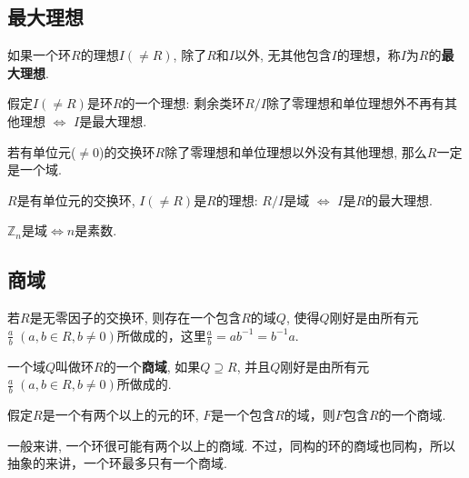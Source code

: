 \subsection{最大理想}

\begin{Definition}[最大理想]
如果一个环$R$的理想$I (\neq R)$, 除了$R$和$I$以外, 无其他包含$I$的理想，称$I$为$R$的\textbf{最大理想}.
\end{Definition}

\begin{Lemma}
假定$I (\neq R)$是环$R$的一个理想: 剩余类环$R/I$除了零理想和单位理想外不再有其他理想 $\Leftrightarrow$ $I$是最大理想.
\end{Lemma}

\begin{Lemma}
若有单位元($\neq \mathfrak{0}$)的交换环$R$除了零理想和单位理想以外没有其他理想, 那么$R$一定是一个域.
\end{Lemma}

\begin{Theorem}[!]
$R$是有单位元的交换环, $I (\neq R)$是$R$的理想: $R/I$是域 $\Leftrightarrow$
$I$是$R$的最大理想.
\end{Theorem}

\begin{Proposition}
$\mathbb{Z}_n$是域$\Leftrightarrow n$是素数. 
\end{Proposition}

\subsection{商域}

\begin{Theorem}
若$R$是无零因子的交换环, 则存在一个包含$R$的域$Q$, 使得$Q$刚好是由所有元$\displaystyle \frac{a}{b} \; (a, b \in R, b \neq \mathfrak{0} )$所做成的，这里$\displaystyle \frac{a}{b} = ab^{-1} = b^{-1}a$.
\end{Theorem}

\begin{Definition}[商域]
一个域$Q$叫做环$R$的一个\textbf{商域}, 如果$Q \supseteq R$, 并且$Q$刚好是由所有元$\displaystyle \frac{a}{b} \; (a, b \in R, b \neq 0)$所做成的.
\end{Definition}

\begin{Theorem}
假定$R$是一个有两个以上的元的环, $F$是一个包含$R$的域，则$F$包含$R$的一个商域.
\end{Theorem}

\begin{Note}
一般来讲, 一个环很可能有两个以上的商域. 不过，同构的环的商域也同构，所以抽象的来讲，一个环最多只有一个商域.
\end{Note}
